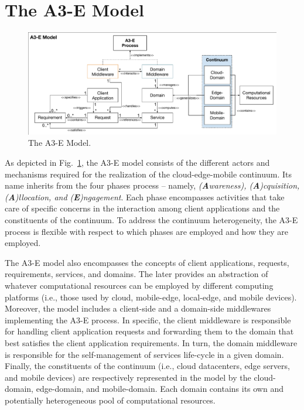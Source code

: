 \section{The A3-E Model}\label{sec:proposal}

\begin{figure}[tbp]
	\includegraphics[width=1\textwidth]{figs/A3-E-model.pdf}
	\caption{The A3-E Model.}
	\label{fig:A3-E-model}
\end{figure}

As depicted in Fig.~\ref{fig:A3-E-model}, the A3-E model consists of the different actors and mechanisms required for the realization of the cloud-edge-mobile continuum. Its name inherits from the four phases process -- namely, \textit{(\textbf{A}wareness), (\textbf{A})cquisition, (\textbf{A})llocation, and (\textbf{E})ngagement}. Each phase encompasses activities that take care of specific concerns in the interaction among client applications and the constituents of the continuum. To address the continuum heterogeneity, the A3-E process is flexible with respect to which phases are employed and how they are employed.

The A3-E model also encompasses the concepts of client applications, requests, requirements, services, and domains. The later provides an abstraction of whatever computational resources can be employed by different computing platforms (i.e., those used by cloud, mobile-edge, local-edge, and mobile devices). Moreover, the model includes a client-side and a domain-side middlewares implementing the A3-E process. In specific, the client middleware is responsible for handling client application requests and forwarding them to the domain that best satisfies the client application requirements.  In turn, the domain middleware is responsible for the self-management of services life-cycle in a given domain. Finally, the constituents of the continuum (i.e., cloud datacenters, edge servers, and mobile devices) are respectively represented in the model by the cloud-domain, edge-domain, and mobile-domain. Each domain contains its own and potentially heterogeneous pool of computational resources.

